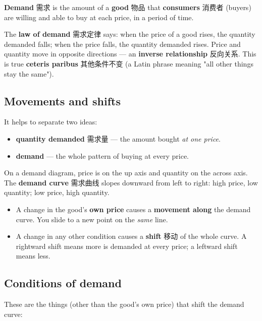 \documentclass[11pt]{article}
\begin{document}
\textbf{Demand} 需求 is the amount of a \textbf{good} 物品 that \textbf{consumers} 消费者 (buyers) are willing and able to buy at each price, in a period of time.

The \textbf{law of demand} 需求定律 says: when the price of a good rises, the quantity demanded falls; when the price falls, the quantity demanded rises. Price and quantity move in opposite directions — an \textbf{inverse relationship} 反向关系. This is true \textbf{ceteris paribus} 其他条件不变 (a Latin phrase meaning "all other things stay the same").

\subsection*{Movements and shifts}

It helps to separate two ideas:

\begin{itemize}
\item \textbf{quantity demanded} 需求量 — the amount bought \emph{at one price}.

\item \textbf{demand} — the whole pattern of buying at every price.

\end{itemize}

On a demand diagram, price is on the up axis and quantity on the across axis. The \textbf{demand curve} 需求曲线 slopes downward from left to right: high price, low quantity; low price, high quantity.

\begin{itemize}
\item A change in the good's \textbf{own price} causes a \textbf{movement along} the demand curve. You slide to a new point on the \emph{same} line.

\item A change in any other condition causes a \textbf{shift} 移动 of the whole curve. A rightward shift means more is demanded at every price; a leftward shift means less.

\end{itemize}

\subsection*{Conditions of demand}

These are the things (other than the good's own price) that shift the demand curve:
\end{document}
